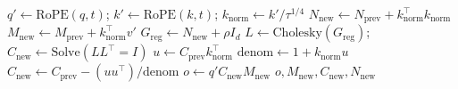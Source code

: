 \documentclass[11pt,a4paper]{article}
\theoremstyle{remark}
\begin{document}
\begin{algorithm}[h]
\caption{RhoAttn\_Recurrent\_Step($q, k, v, M_{\text{prev}}, C_{\text{prev}}, N_{\text{prev}}, \rho, t$)}
\begin{algorithmic}[1]
\State $q' \gets \text{RoPE}(q, t)$; $k' \gets \text{RoPE}(k, t)$; $k_{\text{norm}} \gets k' / \tau^{1/4}$
\State $N_{\text{new}} \gets N_{\text{prev}} + k_{\text{norm}}^\top k_{\text{norm}}$ 
\State $M_{\text{new}} \gets M_{\text{prev}} + k_{\text{norm}}^\top v'$ 
 
    \State $G_{\text{reg}} \gets N_{\text{new}} + \rho I_d$
    \State $L \gets \text{Cholesky}(G_{\text{reg}})$; $C_{\text{new}} \gets \text{Solve}(L L^\top = I)$
\Else
    \State $u \gets C_{\text{prev}} k_{\text{norm}}^\top$ 
    \State $\text{denom} \gets 1 + k_{\text{norm}} u$
    \State $C_{\text{new}} \gets C_{\text{prev}} - (u u^\top) / \text{denom}$ 
\EndIf
\State $o \gets q' C_{\text{new}} M_{\text{new}}$ 
\State \Return $o, M_{\text{new}}, C_{\text{new}}, N_{\text{new}}$
\end{algorithmic}
\end{algorithm}
\end{document}

